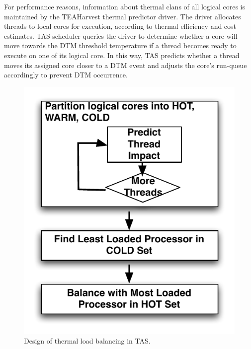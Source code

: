\documentclass[times, 10pt,twocolumn]{IEEEtran}
\begin{document}
For performance reasons, information about thermal clans of all logical
cores is maintained by the TEAHarvest thermal predictor driver.  The
driver allocates threads to local cores for execution, according to
thermal efficiency and cost estimates.  TAS scheduler queries the driver
to determine whether a core will move towards the DTM threshold
temperature if a thread becomes ready to execute on one of its logical
core.  In this way, TAS predicts whether a thread moves its assigned
core closer to a DTM event and adjusts the core's run-queue accordingly
to prevent DTM occurrence.

\begin{figure}[t] \centering
  \includegraphics[scale=0.7]{tbalance.pdf}
  \caption{Design of thermal load balancing in TAS.}
  \label{fig:thermbal}
\end{figure}
\end{document}
